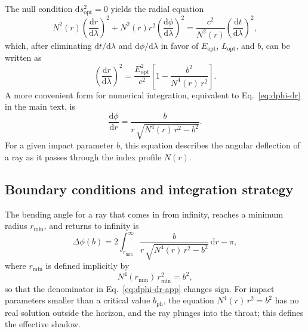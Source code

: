 \documentclass[11pt]{article}
\begin{document}
The null condition \(\mathrm{d}s_{\text{opt}}^2 = 0\) yields the radial
equation
\begin{equation}
  N^2(r) \left( \frac{\mathrm{d}r}{\mathrm{d}\lambda} \right)^2
  + N^2(r) r^2 \left( \frac{\mathrm{d}\phi}{\mathrm{d}\lambda} \right)^2
  = \frac{c^2}{N^2(r)}
    \left( \frac{\mathrm{d}t}{\mathrm{d}\lambda} \right)^2,
\end{equation}
which, after eliminating \(\mathrm{d}t/\mathrm{d}\lambda\) and
\(\mathrm{d}\phi/\mathrm{d}\lambda\) in favor of \(E_{\text{opt}}\),
\(L_{\text{opt}}\), and \(b\), can be written as
\begin{equation}
  \left( \frac{\mathrm{d}r}{\mathrm{d}\lambda} \right)^2
  = \frac{E_{\text{opt}}^2}{c^2}
    \left[
      1 - \frac{b^2}{N^4(r)\,r^2}
    \right].
\end{equation}
A more convenient form for numerical integration, equivalent to
Eq.~\eqref{eq:dphi-dr} in the main text, is
\begin{equation}
  \frac{\mathrm{d}\phi}{\mathrm{d}r}
  = \frac{b}{r\,\sqrt{N^4(r)\,r^2 - b^2}}.
  \label{eq:dphi-dr-app}
\end{equation}
For a given impact parameter \(b\), this equation describes the angular
deflection of a ray as it passes through the index profile \(N(r)\).

\subsection{Boundary conditions and integration strategy}
\label{app:lensing-boundary}

The bending angle for a ray that comes in from infinity, reaches a minimum
radius \(r_{\min}\), and returns to infinity is
\begin{equation}
  \Delta\phi(b)
  = 2 \int_{r_{\min}}^{\infty}
      \frac{b}{r\,\sqrt{N^4(r)\,r^2 - b^2}}
      \,\mathrm{d}r
    - \pi,
  \label{eq:bending-angle}
\end{equation}
where \(r_{\min}\) is defined implicitly by
\begin{equation}
  N^4(r_{\min})\,r_{\min}^2
  = b^2,
  \label{eq:rmin-condition}
\end{equation}
so that the denominator in Eq.~\eqref{eq:dphi-dr-app} changes sign.  For
impact parameters smaller than a critical value \(b_{\text{ph}}\), the
equation \(N^4(r)\,r^2 = b^2\) has no real solution outside the horizon,
and the ray plunges into the throat; this defines the effective shadow.
\end{document}
